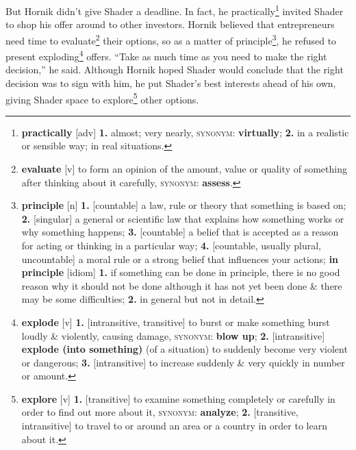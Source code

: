 \documentclass[oneside]{book}
\numberwithin{equation}{section}
\begin{document}
But Hornik didn't give Shader a deadline. In fact, he practically\footnote{\textbf{practically} [adv] \textbf{1.} almost; very nearly, \textsc{synonym}: \textbf{virtually}; \textbf{2.} in a realistic or sensible way; in real situations.} invited Shader to shop his offer around to other investors. Hornik believed that entrepreneurs need time to evaluate\footnote{\textbf{evaluate} [v] to form an opinion of the amount, value or quality of something after thinking about it carefully, \textsc{synonym}: \textbf{assess}.} their options, so as a matter of principle\footnote{\textbf{principle} [n] \textbf{1.} [countable] a law, rule or theory that something is based on; \textbf{2.} [singular] a general or scientific law that explains how something works or why something happens; \textbf{3.} [countable] a belief that is accepted as a reason for acting or thinking in a particular way; \textbf{4.} [countable, usually plural, uncountable] a moral rule or a strong belief that influences your actions; \textbf{in principle} [idiom] \textbf{1.} if something can be done in principle, there is no good reason why it should not be done although it has not yet been done \& there may be some difficulties; \textbf{2.} in general but not in detail.}, he refused to present exploding\footnote{\textbf{explode} [v] \textbf{1.} [intransitive, transitive] to burst or make something burst loudly \& violently, causing damage, \textsc{synonym}: \textbf{blow up}; \textbf{2.} [intransitive] \textbf{explode (into something)} (of a situation) to suddenly become very violent or dangerous; \textbf{3.} [intransitive] to increase suddenly \& very quickly in number or amount.} offers. ``Take as much time as you need to make the right decision,'' he said. Although Hornik hoped Shader would conclude that the right decision was to sign with him, he put Shader's best interests ahead of his own, giving Shader space to explore\footnote{\textbf{explore} [v] \textbf{1.} [transitive] to examine something completely or carefully in order to find out more about it, \textsc{synonym}: \textbf{analyze}; \textbf{2.} [transitive, intransitive] to travel to or around an area or a country in order to learn about it.} other options.
\end{document}
